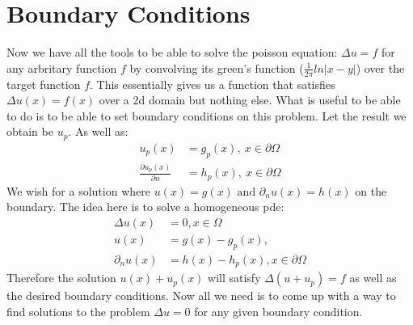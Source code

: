 \documentclass{article}
\begin{document}
\section{Boundary Conditions}
Now we have all the tools to be able to solve the poisson equation: $\Delta u=f$ for any arbritary function $f$ by convolving its green's function ($\frac{1}{2\pi}ln|x-y|$) over the target function $f$.
This essentially gives us a function that satisfies $\Delta u(x)=f(x)$ over a 2d domain but nothing else.
What is useful to be able to do is to be able to set boundary conditions on this problem.
Let the result we obtain be $u_p$. As well as:
\begin{align}
    u_p(x)&=g_p(x),\:x\in\partial\Omega\\
    \frac{\partial u_p(x)}{\partial n}&=h_p(x),\:x\in\partial\Omega
\end{align}
We wish for a solution where $u(x)=g(x)\text{ and }\partial_nu(x)=h(x)$ on the boundary.
The idea here is to solve a homogeneous pde:
\begin{align}
    \Delta u(x)&=0, x\in\Omega\\
    u(x)&=g(x)-g_p(x),\\
    \partial_nu(x)&=h(x)-h_p(x),x\in\partial\Omega
\end{align}
Therefore the solution $u(x)+u_p(x)$ will satisfy $\Delta(u+u_p)=f$ as well as the desired boundary conditions.
Now all we need is to come up with a way to find solutions to the problem $\Delta u=0$ for any given boundary condition.
\end{document}
